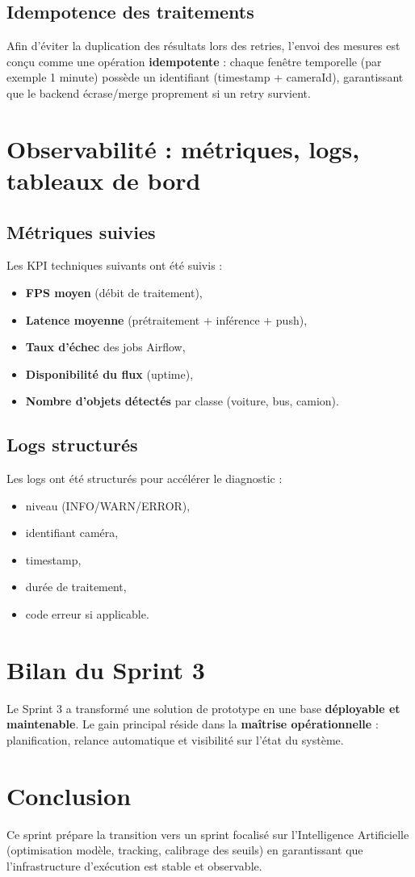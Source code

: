 \subsection{Idempotence des traitements}
Afin d’éviter la duplication des résultats lors des retries, l’envoi des mesures est conçu comme une opération \textbf{idempotente} : chaque fenêtre temporelle (par exemple 1 minute) possède un identifiant (timestamp + cameraId), garantissant que le backend écrase/merge proprement si un retry survient.

\section{Observabilité : métriques, logs, tableaux de bord}
\subsection{Métriques suivies}
Les KPI techniques suivants ont été suivis :
\begin{itemize}
    \item \textbf{FPS moyen} (débit de traitement),
    \item \textbf{Latence moyenne} (prétraitement + inférence + push),
    \item \textbf{Taux d’échec} des jobs Airflow,
    \item \textbf{Disponibilité du flux} (uptime),
    \item \textbf{Nombre d’objets détectés} par classe (voiture, bus, camion).
\end{itemize}

\subsection{Logs structurés}
Les logs ont été structurés pour accélérer le diagnostic :
\begin{itemize}
    \item niveau (INFO/WARN/ERROR),
    \item identifiant caméra,
    \item timestamp,
    \item durée de traitement,
    \item code erreur si applicable.
\end{itemize}

\section{Bilan du Sprint 3}
Le Sprint 3 a transformé une solution de prototype en une base \textbf{déployable et maintenable}. Le gain principal réside dans la \textbf{maîtrise opérationnelle} : planification, relance automatique et visibilité sur l’état du système.

\section{Conclusion}
Ce sprint prépare la transition vers un sprint focalisé sur l’Intelligence Artificielle (optimisation modèle, tracking, calibrage des seuils) en garantissant que l’infrastructure d’exécution est stable et observable.
